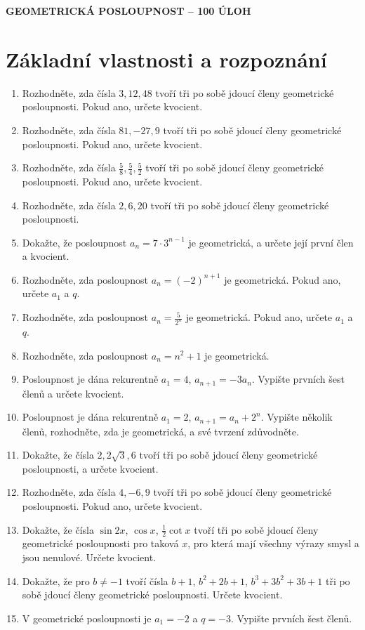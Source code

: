 \documentclass[12pt,a4paper]{article}
\begin{document}
\begin{center}
    {\Large\bfseries GEOMETRICKÁ POSLOUPNOST -- 100 ÚLOH}
\end{center}

\section*{Základní vlastnosti a rozpoznání}
\begin{enumerate}[label=\arabic*.,start=1]
    \item Rozhodněte, zda čísla $3,12,48$ tvoří tři po sobě jdoucí členy geometrické posloupnosti. Pokud ano, určete kvocient.
    \item Rozhodněte, zda čísla $81,-27,9$ tvoří tři po sobě jdoucí členy geometrické posloupnosti. Pokud ano, určete kvocient.
    \item Rozhodněte, zda čísla $\frac58,\frac54,\frac52$ tvoří tři po sobě jdoucí členy geometrické posloupnosti. Pokud ano, určete kvocient.
    \item Rozhodněte, zda čísla $2,6,20$ tvoří tři po sobě jdoucí členy geometrické posloupnosti.
    \item Dokažte, že posloupnost $a_n=7\cdot3^{n-1}$ je geometrická, a určete její první člen a kvocient.
    \item Rozhodněte, zda posloupnost $a_n=(-2)^{n+1}$ je geometrická. Pokud ano, určete $a_1$ a $q$.
    \item Rozhodněte, zda posloupnost $a_n=\frac{5}{2^n}$ je geometrická. Pokud ano, určete $a_1$ a $q$.
    \item Rozhodněte, zda posloupnost $a_n=n^2+1$ je geometrická.
    \item Posloupnost je dána rekurentně $a_1=4$, $a_{n+1}=-3a_n$. Vypište prvních šest členů a určete kvocient.
    \item Posloupnost je dána rekurentně $a_1=2$, $a_{n+1}=a_n+2^n$. Vypište několik členů, rozhodněte, zda je geometrická, a své tvrzení zdůvodněte.
    \item Dokažte, že čísla $2,2\sqrt3,6$ tvoří tři po sobě jdoucí členy geometrické posloupnosti, a určete kvocient.
    \item Rozhodněte, zda čísla $4,-6,9$ tvoří tři po sobě jdoucí členy geometrické posloupnosti. Pokud ano, určete kvocient.
    \item Dokažte, že čísla $\sin 2x$, $\cos x$, $\frac12\cot x$ tvoří tři po sobě jdoucí členy geometrické posloupnosti pro taková $x$, pro která mají všechny výrazy smysl a jsou nenulové. Určete kvocient.
    \item Dokažte, že pro $b\neq-1$ tvoří čísla $b+1$, $b^2+2b+1$, $b^3+3b^2+3b+1$ tři po sobě jdoucí členy geometrické posloupnosti. Určete kvocient.
    \item V geometrické posloupnosti je $a_1=-2$ a $q=-3$. Vypište prvních šest členů.
\end{enumerate}
\end{document}
